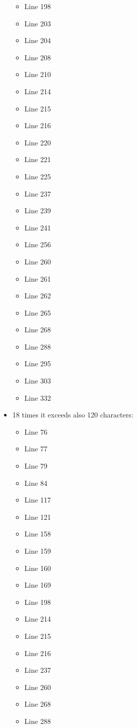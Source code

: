 \begin{itemize}
\begin{itemize}
\item Line 198
\item Line 203
\item Line 204
\item Line 208  
\item Line 210
\item Line 214
\item Line 215
\item Line 216
\item Line 220
\item Line 221
\item Line 225
\item Line 237
\item Line 239
\item Line 241
\item Line 256
\item Line 260
\item Line 261
\item Line 262
\item Line 265
\item Line 268
\item Line 288
\item Line 295
\item Line 303
\item Line 332 
\end{itemize}

\item 18 times it exceeds also 120 characters:
\begin{itemize}
\item Line 76
\item Line 77
\item Line 79
\item Line 84
\item Line 117
\item Line 121
\item Line 158
\item Line 159
\item Line 160
\item Line 169
\item Line 198
\item Line 214
\item Line 215
\item Line 216
\item Line 237
\item Line 260
\item Line 268
\item Line 288
\end{itemize}
\end{itemize}

